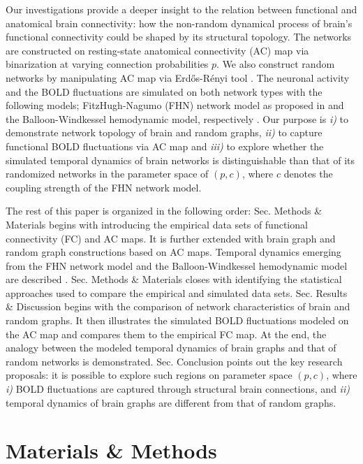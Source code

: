 \documentclass[fleqn,10pt]{wlpeerj}
\begin{document}
Our investigations provide a deeper insight to the relation between functional and anatomical brain connectivity: how the non-random dynamical process of brain's functional connectivity could be shaped by its structural topology. The networks are constructed on resting-state anatomical connectivity (AC) map via binarization at varying connection probabilities $p$. We also construct random networks by manipulating AC map via Erd\H{o}s-R\'{e}nyi tool \citep{XYZERD}. The neuronal activity and the BOLD fluctuations are simulated on both network types with the following models; FitzHugh-Nagumo (FHN) network model as proposed in \citep{GHO08, GHO08a} and the Balloon-Windkessel hemodynamic model, respectively \citep{FRI00}. Our purpose is \textit{i)} to demonstrate network topology of brain and random graphs, \textit{ii)} to capture functional BOLD fluctuations via AC map and \textit{iii)} to explore whether the simulated temporal dynamics of brain networks is distinguishable than that of its randomized networks in the parameter space of $(p,c)$, where  $c$ denotes the coupling strength of the FHN network model. 

The rest of this paper is organized in the following order: Sec. Methods \& Materials begins with introducing the empirical data sets of functional connectivity (FC) and AC maps. It is further extended with brain graph and random graph constructions based on AC maps. Temporal dynamics emerging from the FHN network model and the Balloon-Windkessel hemodynamic model are described \citep{FIT61, FRI00}. Sec. Methods \& Materials closes with identifying the statistical approaches used to compare the empirical and simulated data sets. Sec. Results \& Discussion begins with the comparison of network characteristics of brain and random graphs. It then illustrates the simulated BOLD fluctuations modeled on the AC map and compares them to the empirical FC map. At the end, the analogy between the modeled temporal dynamics of brain graphs and that of random networks is demonstrated. Sec. Conclusion points out the key research proposals: it is possible to explore such regions on parameter space $(p,c)$, where \textit{i)} BOLD fluctuations are captured through structural brain connections, and \textit{ii)} temporal dynamics of brain graphs are different from that of random graphs. 
 


\section*{Materials \& Methods}
\end{document}
